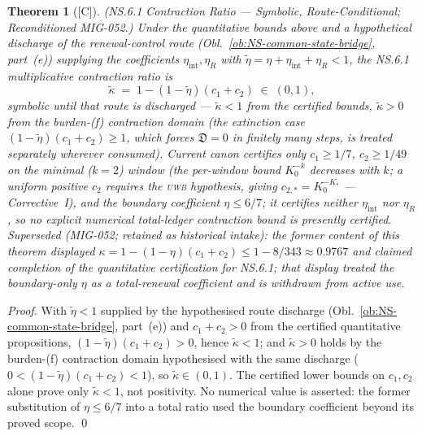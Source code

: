 \documentclass[12pt,oneside]{amsbook}
\theoremstyle{plain}
\newtheorem{theorem}{Theorem}[section]
\theoremstyle{definition}
\theoremstyle{remark}
\newcommand{\status}[1]{\textup{[#1]}}
\begin{document}
\begin{theorem}[\status{C}]\label{thm:NS-kappa-explicit}
\textup{(NS.6.1 Contraction Ratio --- Symbolic, Route-Conditional;
Reconditioned MIG-052.)}
Under the quantitative bounds above \emph{and a hypothetical
discharge of the renewal-control route
(Obl.~\ref{ob:NS-common-state-bridge}, part~(e)) supplying the
coefficients $\eta_{\mathrm{int}}, \eta_R$ with
$\widetilde\eta = \eta + \eta_{\mathrm{int}} + \eta_R < 1$},
the NS.6.1 multiplicative contraction ratio is
\[
 \widetilde\kappa \;=\; 1 - (1-\widetilde\eta)(c_1 + c_2)
 \;\in\; (0,1),
\]
symbolic until that route is discharged --- $\widetilde\kappa < 1$
from the certified bounds, $\widetilde\kappa > 0$ from the
burden-(f) contraction domain (the extinction case
$(1-\widetilde\eta)(c_1+c_2) \geq 1$, which forces
$\mathfrak{D} = 0$ in finitely many steps, is treated separately
wherever consumed). Current canon certifies
only $c_1 \geq 1/7$, $c_2 \geq 1/49$ \emph{on the minimal
($k=2$) window} (the per-window bound $K_0^{-k}$ decreases with
$k$; a uniform positive $c_2$ requires the \textsc{uwb}
hypothesis, giving $c_{2,*} = K_0^{-K_*}$ --- Corrective~I), and
the \emph{boundary} coefficient $\eta \leq 6/7$; it certifies
neither
$\eta_{\mathrm{int}}$ nor $\eta_R$, so \emph{no explicit
numerical total-ledger contraction bound is presently certified}.
\emph{Superseded (MIG-052; retained as historical intake):} the
former content of this theorem displayed
$\kappa = 1-(1-\eta)(c_1+c_2) \leq 1-8/343 \approx 0.9767$ and
claimed completion of the quantitative certification for NS.6.1;
that display treated the boundary-only $\eta$ as a total-renewal
coefficient and is withdrawn from active use.
\end{theorem}

\begin{proof}
With $\widetilde\eta < 1$ supplied by the hypothesised route
discharge (Obl.~\ref{ob:NS-common-state-bridge}, part~(e)) and
$c_1 + c_2 > 0$ from the certified quantitative propositions,
$(1-\widetilde\eta)(c_1+c_2) > 0$, hence
$\widetilde\kappa < 1$; and $\widetilde\kappa > 0$ holds by the
burden-(f) contraction domain hypothesised with the same discharge
($0 < (1-\widetilde\eta)(c_1+c_2) < 1$), so
$\widetilde\kappa \in (0,1)$. The certified lower bounds on
$c_1, c_2$ alone prove only $\widetilde\kappa < 1$, not
positivity. No numerical value is asserted: the former
substitution of $\eta \leq 6/7$ into a total ratio used the
boundary coefficient beyond its proved scope. \qed
\end{proof}
\end{document}
